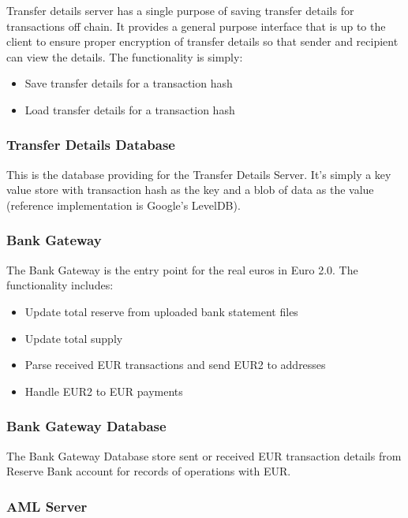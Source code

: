 \documentclass[a4paper,12pt]{article} %
\begin{document}
{Transfer details server has a single purpose of saving transfer details for transactions off chain. It provides a general purpose interface that is up to the client to ensure proper encryption of transfer details so that sender and recipient can view the details. The functionality is simply:

\begin{itemize}
	\item Save transfer details for a transaction hash
	\item Load transfer details for a transaction hash
\end{itemize}

\subsubsection{Transfer Details Database} \label{sssec:3.5:transferDetailsDatabase}

This is the database providing for the Transfer Details Server. It's simply a key value store with transaction hash as the key and a blob of data as the value (reference implementation is Google's LevelDB).

\subsubsection{Bank Gateway} \label{sssec:3.5:bankGateway}

The Bank Gateway is the entry point for the real euros in Euro 2.0. The functionality includes:

\begin{itemize}
	\item Update total reserve from uploaded bank statement files
	\item Update total supply
	\item Parse received EUR transactions and send EUR2 to addresses
	\item Handle EUR2 to EUR payments
\end{itemize}

\subsubsection{Bank Gateway Database} \label{sssec:3.5:bankGatewayDb}

The Bank Gateway Database store sent or received EUR transaction details from Reserve Bank account for records of operations with EUR.

\subsubsection{AML Server} \label{sssec:3.5:amlServer}

}
\end{document}
